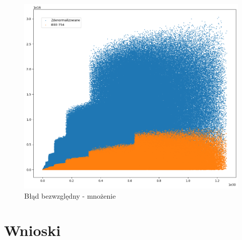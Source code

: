 \documentclass{article}
\begin{document}
\begin{figure}[H]
	\centering
	\includegraphics[height=0.4\textheight]{figures/mul_ulp.png}
	\caption{Błąd bezwzględny - mnożenie}
	\label{fig:mul_ulp}
\end{figure}

\section{Wnioski}


\newpage
{}
{}


\end{document}
